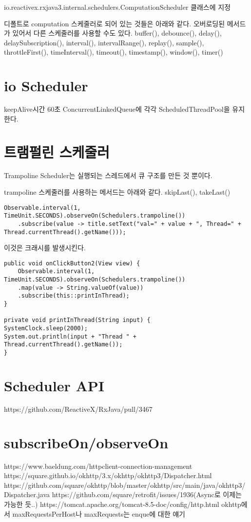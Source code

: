 \documentclass{book}
\begin{document}
{io.reactivex.rxjava3.internal.schedulers.ComputationScheduler 클래스에 지정

디폴트로 computation 스케줄러로 되어 있는 것들은 아래와 같다.  오버로딩된 
메서드가 있어서 다른 스케줄러를 사용할 수도 있다.
buffer(), debounce(), delay(), delaySubscription(),
interval(), intervalRange(), 
replay(), sample(), throttleFirst(), timeInterval(), timeout(), timestamp(), window(), 
timer()


\section{io Scheduler}
keepAlive시간 60초
ConcurrentLinkedQueue에 각각 ScheduledThreadPool을 유지한다.

\section{트램펄린 스케줄러}
Trampoline Scheduler는 실행되는 스레드에서 큐 구조를 만든 것 뿐이다.

trampoline 스케줄러를 사용하는 메서드는 아래와 같다.
skipLast(), takeLast()

\begin{verbatim}
Observable.interval(1, TimeUnit.SECONDS).observeOn(Schedulers.trampoline())
	.subscribe(value -> title.setText("val=" + value + ", Thread=" + 		Thread.currentThread().getName()));
\end{verbatim}

이것은 크래시를 발생시킨다.

\begin{verbatim}
public void onClickButton2(View view) {
	Observable.interval(1, TimeUnit.SECONDS).observeOn(Schedulers.trampoline())
	.map(value -> String.valueOf(value))
	.subscribe(this::printInThread);
}

private void printInThread(String input) {
SystemClock.sleep(2000);
System.out.println(input + "Thread " + Thread.currentThread().getName());
}
\end{verbatim}

\section{Scheduler API}
https://github.com/ReactiveX/RxJava/pull/3467

\section{subscribeOn/observeOn}
https://www.baeldung.com/httpclient-connection-management
https://square.github.io/okhttp/3.x/okhttp/okhttp3/Dispatcher.html
https://github.com/square/okhttp/blob/master/okhttp/src/main/java/okhttp3/Dispatcher.java
https://github.com/square/retrofit/issues/1936(Async로 이제는 가능한 듯..)
https://tomcat.apache.org/tomcat-8.5-doc/config/http.html
okhttp에서 maxRequestsPerHost나 maxRequests는 enque에 대한 얘기

}
\end{document}
